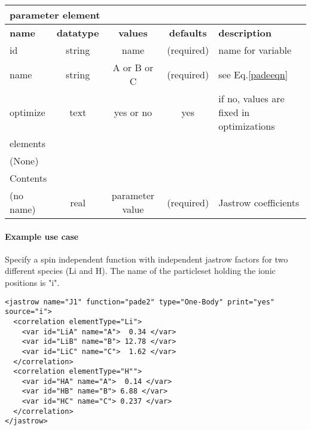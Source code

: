 \begin{table}[h]
\begin{center}
\begin{tabular}{l c c c l }
\hline
\multicolumn{5}{l}{parameter element} \\
\hline
\bfseries name & \bfseries datatype & \bfseries values & \bfseries defaults & \bfseries description \\
\hline
id & string & name & (required) & name for variable \\
name & string & A or B or C & (required) & see Eq.\ref{padeeqn}\\
optimize & text & yes or no & yes & if no, values are fixed in optimizations \\
\hline
\multicolumn{5}{l}{elements}\\ \hline
(None) & & & \\ \hline
\multicolumn{5}{l}{Contents}\\ \hline
 (no name) & real & parameter value & (required) & Jastrow coefficients \\ \hline
\end{tabular}
\end{center}
\end{table}

\paragraph{Example use case}
\label{sec:1bjpadeexamples}

Specify a spin independent function with independent jastrow factors for two different species (Li and H).
The name of the particleset holding the ionic positions is "i".
\begin{lstlisting}[style=XML]
<jastrow name="J1" function="pade2" type="One-Body" print="yes" source="i">
  <correlation elementType="Li">
    <var id="LiA" name="A">  0.34 </var>
    <var id="LiB" name="B"> 12.78 </var>
    <var id="LiC" name="C">  1.62 </var>
  </correlation>
  <correlation elementType="H"">
    <var id="HA" name="A">  0.14 </var>
    <var id="HB" name="B"> 6.88 </var>
    <var id="HC" name="C"> 0.237 </var>
  </correlation>
</jastrow>
\end{lstlisting}
